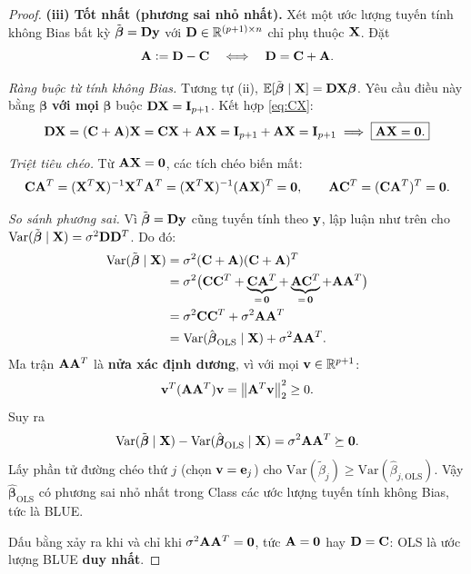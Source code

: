 \begin{proof}
\medskip
\noindent\textbf{(iii) Tốt nhất (phương sai nhỏ nhất).}
Xét một ước lượng tuyến tính không Bias bất kỳ
$\tilde{\boldsymbol{\beta}} = \mathbf{D}\mathbf{y}$ với $\mathbf{D} \in \mathbb{R}^{(p+1)\times n}$ chỉ
phụ thuộc $\mathbf{X}$. Đặt
\[
    \mathbf{A} \mathrel{\mathop:}= \mathbf{D} - \mathbf{C}
    \quad\Longleftrightarrow\quad
    \mathbf{D} = \mathbf{C} + \mathbf{A}.
\]

\emph{Ràng buộc từ tính không Bias.} Tương tự (ii),
$\mathbb{E}[\tilde{\boldsymbol{\beta}}\mid\mathbf{X}] = \mathbf{D}\mathbf{X}\boldsymbol{\beta}$.
Yêu cầu điều này bằng $\boldsymbol{\beta}$ \textbf{với mọi} $\boldsymbol{\beta}$ buộc
$\mathbf{D}\mathbf{X} = \mathbf{I}_{p+1}$. Kết hợp \eqref{eq:CX}:
\[
    \mathbf{D}\mathbf{X} = (\mathbf{C} + \mathbf{A})\mathbf{X}
    = \mathbf{C}\mathbf{X} + \mathbf{A}\mathbf{X}
    = \mathbf{I}_{p+1} + \mathbf{A}\mathbf{X}
    = \mathbf{I}_{p+1}
    \;\Longrightarrow\;
    \boxed{\mathbf{A}\mathbf{X} = \mathbf{0}.}
\]

\emph{Triệt tiêu chéo.} Từ $\mathbf{A}\mathbf{X} = \mathbf{0}$, các tích chéo biến mất:
\[
    \mathbf{C}\mathbf{A}^T
    = (\mathbf{X}^T\mathbf{X})^{-1}\mathbf{X}^T\mathbf{A}^T
    = (\mathbf{X}^T\mathbf{X})^{-1}(\mathbf{A}\mathbf{X})^T
    = \mathbf{0},
    \qquad
    \mathbf{A}\mathbf{C}^T = (\mathbf{C}\mathbf{A}^T)^T = \mathbf{0}.
\]

\emph{So sánh phương sai.} Vì $\tilde{\boldsymbol{\beta}} = \mathbf{D}\mathbf{y}$ cũng tuyến tính
theo $\mathbf{y}$, lập luận như trên cho
$\mathrm{Var}(\tilde{\boldsymbol{\beta}}\mid\mathbf{X}) = \sigma^2\mathbf{D}\mathbf{D}^T$. Do đó:
\begin{align*}
    \mathrm{Var}(\tilde{\boldsymbol{\beta}}\mid\mathbf{X})
    &= \sigma^2(\mathbf{C} + \mathbf{A})(\mathbf{C} + \mathbf{A})^T \\
    &= \sigma^2\bigl(\mathbf{C}\mathbf{C}^T
        + \underbrace{\mathbf{C}\mathbf{A}^T}_{=\,\mathbf{0}}
        + \underbrace{\mathbf{A}\mathbf{C}^T}_{=\,\mathbf{0}}
        + \mathbf{A}\mathbf{A}^T\bigr) \\
    &= \sigma^2\mathbf{C}\mathbf{C}^T + \sigma^2\mathbf{A}\mathbf{A}^T \\
    &= \mathrm{Var}(\hat{\boldsymbol{\beta}}_{\mathrm{OLS}}\mid\mathbf{X})
       + \sigma^2\mathbf{A}\mathbf{A}^T.
\end{align*}
Ma trận $\mathbf{A}\mathbf{A}^T$ là \textbf{nửa xác định dương}, vì với mọi
$\mathbf{v} \in \mathbb{R}^{p+1}$:
\[
    \mathbf{v}^T(\mathbf{A}\mathbf{A}^T)\mathbf{v} = \left\lVert\mathbf{A}^T\mathbf{v}\right\rVert_2^2 \geq 0.
\]
Suy ra
\[
    \mathrm{Var}(\tilde{\boldsymbol{\beta}}\mid\mathbf{X})
    - \mathrm{Var}(\hat{\boldsymbol{\beta}}_{\mathrm{OLS}}\mid\mathbf{X})
    = \sigma^2\mathbf{A}\mathbf{A}^T \succeq \mathbf{0}.
\]
Lấy phần tử đường chéo thứ $j$ (chọn $\mathbf{v} = \mathbf{e}_j$) cho
$\mathrm{Var}(\tilde{\beta}_j) \geq \mathrm{Var}(\hat{\beta}_{j,\mathrm{OLS}})$. Vậy
$\hat{\boldsymbol{\beta}}_{\mathrm{OLS}}$ có phương sai nhỏ nhất trong Class các ước lượng
tuyến tính không Bias, tức là BLUE.

\medskip
Dấu bằng xảy ra khi và chỉ khi $\sigma^2\mathbf{A}\mathbf{A}^T = \mathbf{0}$, tức $\mathbf{A} = \mathbf{0}$
hay $\mathbf{D} = \mathbf{C}$: OLS là ước lượng BLUE \textbf{duy nhất}.
\end{proof}

